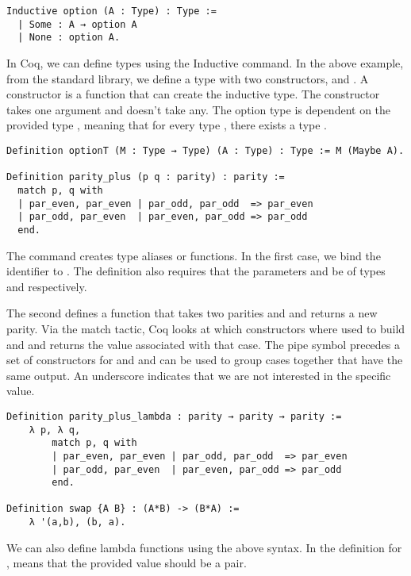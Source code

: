 \begin{verbatim}
Inductive option (A : Type) : Type := 
  | Some : A → option A
  | None : option A.
\end{verbatim}
In Coq, we can define types using the Inductive command. In the above example,
from the standard library,
we define a type  with two constructors, 
and . A constructor is a function that can create the
inductive type. The  constructor takes one
argument and  doesn't take any. The option type is dependent on the
provided type , meaning that for every type , 
there exists a type .

\begin{verbatim}
Definition optionT (M : Type → Type) (A : Type) : Type := M (Maybe A).

Definition parity_plus (p q : parity) : parity :=
  match p, q with 
  | par_even, par_even | par_odd, par_odd  => par_even
  | par_odd, par_even  | par_even, par_odd => par_odd
  end.
\end{verbatim}

The  command creates type aliases or functions. 
In the first case, we
bind the identifier  to . The definition
also requires that the parameters  and  be of types  and  respectively.

The second  defines a function  that takes
two parities  and  and returns a new parity. Via the match
tactic, Coq looks at which constructors where used to build  and
 and returns the value associated with that case. The pipe symbol \coq{| }
precedes a set of constructors for  and  and can be used to
group cases together that have the same output. An underscore indicates that
we are not interested in the specific value. 

\begin{verbatim}
Definition parity_plus_lambda : parity → parity → parity :=
    λ p, λ q, 
        match p, q with 
        | par_even, par_even | par_odd, par_odd  => par_even
        | par_odd, par_even  | par_even, par_odd => par_odd
        end.

Definition swap {A B} : (A*B) -> (B*A) :=
    λ '(a,b), (b, a).
\end{verbatim}

We can also define lambda functions using the above syntax. In the definition
for ,  means that the provided value should be a pair.


